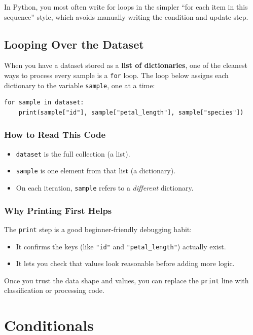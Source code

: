 \noindent
In Python, you most often write for loops in the simpler ``for each item in this sequence'' style, which avoids manually writing the condition and update step.

\subsection{Looping Over the Dataset}
\label{sec:ses3_loop}

When you have a dataset stored as a \textbf{list of dictionaries}, one of the cleanest ways to process every sample is a \texttt{for} loop. The loop below assigns each dictionary to the variable \texttt{sample}, one at a time:

\begin{verbatim}
for sample in dataset:
    print(sample["id"], sample["petal_length"], sample["species"])
\end{verbatim}

\subsubsection{How to Read This Code}
\begin{itemize}
  \item \texttt{dataset} is the full collection (a list).
  \item \texttt{sample} is one element from that list (a dictionary).
  \item On each iteration, \texttt{sample} refers to a \emph{different} dictionary.
\end{itemize}

\subsubsection{Why Printing First Helps}
The \texttt{print} step is a good beginner-friendly debugging habit:
\begin{itemize}
  \item It confirms the keys (like \texttt{"id"} and \texttt{"petal\_length"}) actually exist.
  \item It lets you check that values look reasonable before adding more logic.
\end{itemize}

\noindent
Once you trust the data shape and values, you can replace the \texttt{print} line with classification or processing code.


\section{Conditionals}

